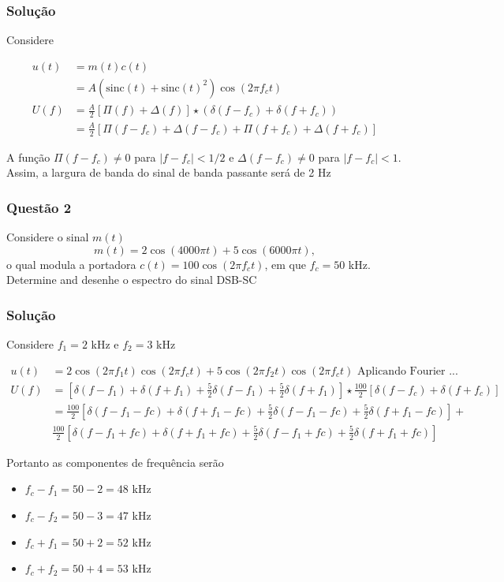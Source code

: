\documentclass[10pt,hyperref={pdfpagemode=FullScreen},aspectratio=169]{beamer}
\begin{document}
\begin{frame}
  \frametitle{Solução}

  Considere 

\begin{align*}
 u(t) &= m(t)c(t) \\
      &=A\left(\text{sinc}(t) + \text{sinc}(t)^2 \right)   \cos(2\pi f_c t) \\
U(f) & = \frac{A}{2} \left[ \Pi (f)  + \Delta (f)\right]  \star  \left(\delta (f-f_c) + \delta (f+f_c) \right) \\
      &= \frac{A}{2} \left[ \Pi (f-f_c)  +  \Delta (f - f_c) +  \Pi (f+f_c)  +  \Delta (f + f_c)\right]
\end{align*}

A função $\Pi (f-f_c) \neq 0$ para $|f-f_c|<1/2$ e  $\Delta (f-f_c) \neq 0$ para $|f-f_c|<1$. Assim, a largura de banda do sinal de banda passante será de 2 Hz


\end{frame}

\begin{frame}
  \frametitle{Questão 2}

  
Considere o sinal $m(t)$
$$
m(t) = 2\cos(4000\pi t) + 5\cos(6000\pi t),
$$
o qual modula a portadora $c(t) = 100\cos(2\pi f_c t)$, em que $f_c = 50$ kHz. Determine and desenhe o espectro do sinal DSB-SC

\end{frame}

\begin{frame}
  \frametitle{Solução}

  Considere $f_1= 2$ kHz e $f_2= 3$ kHz

\begin{align*}
  u(t) & =  2\cos(2\pi f_1 t)\cos(2\pi f_c t) + 5\cos(2\pi f_2 t)\cos(2\pi f_c t)  \text{ Aplicando Fourier ...}  \\ 
  U(f) & = \left[\delta (f - f_1) + \delta (f + f_1) + \frac{5}{2}\delta (f - f_1) + \frac{5}{2}\delta (f + f_1)\right] \star \frac{100
  }{2}\left[ \delta (f - f_c) + \delta (f + f_c)\right] \\
     & =  \frac{100}{2}\left[\delta (f - f_1 - fc)  + \delta (f + f_1 - fc) + \frac{5}{2}\delta (f - f_1 - fc) + \frac{5}{2}\delta (f + f_1 - fc)\right] + \\
     & \frac{100}{2}\left[\delta (f - f_1 + fc)  + \delta (f + f_1 + fc) + \frac{5}{2}\delta (f - f_1 + fc) + \frac{5}{2}\delta (f + f_1 + fc)\right] 
\end{align*}

Portanto as componentes de frequência serão 


\begin{itemize}
  \item  $f_c - f_1 = 50  - 2 = 48$ \si{\kilo\hertz} 
  \item $f_c - f_2 = 50  - 3 = 47$ \si{\kilo\hertz} 
  \item $f_c + f_1 = 50  + 2 = 52$ \si{\kilo\hertz} 
  \item $f_c + f_2 = 50  + 4 = 53$ \si{\kilo\hertz}
  
\end{itemize}

\end{frame}
\end{document}
